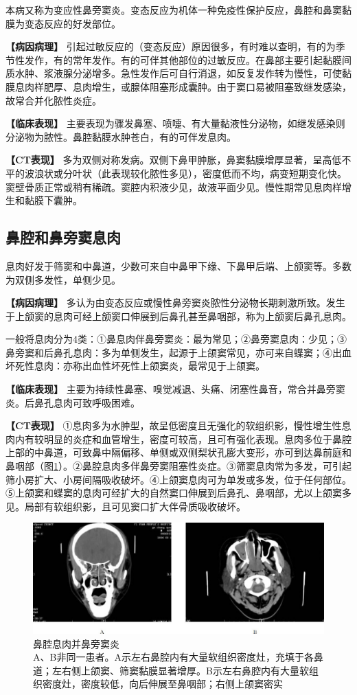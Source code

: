 本病又称为变应性鼻旁窦炎。变态反应为机体一种免疫性保护反应，鼻腔和鼻窦黏膜为变态反应的好发部位。

\textbf{【病因病理】}
引起过敏反应的（变态反应）原因很多，有时难以查明，有的为季节性发作，有的常年发作。有的可伴其他部位的过敏反应。在鼻部主要引起黏膜间质水肿、浆液腺分泌增多。急性发作后可自行消退，如反复发作转为慢性，可使黏膜息肉样肥厚、息肉增生，或腺体阻塞形成囊肿。由于窦口易被阻塞致继发感染，故常合并化脓性炎症。

\textbf{【临床表现】}
主要表现为骤发鼻塞、喷嚏、有大量黏液性分泌物，如继发感染则分泌物为脓性。鼻腔黏膜水肿苍白，有的可伴发息肉。

\textbf{【CT表现】}
多为双侧对称发病。双侧下鼻甲肿胀，鼻窦黏膜增厚显著，呈高低不平的波浪状或分叶状（此表现较化脓性多见），密度低而不均，病变短期变化快。窦壁骨质正常或稍有稀疏。窦腔内积液少见，故液平面少见。慢性期常见息肉样增生和黏膜下囊肿。

\subsection{鼻腔和鼻旁窦息肉}

息肉好发于筛窦和中鼻道，少数可来自中鼻甲下缘、下鼻甲后端、上颌窦等。多数为双侧多发性，单侧少见。

\textbf{【病因病理】}
多认为由变态反应或慢性鼻旁窦炎脓性分泌物长期刺激所致。发生于上颌窦的息肉可经上颌窦口伸展到后鼻孔甚至鼻咽部，称为上颌窦后鼻孔息肉。

一般将息肉分为4类：①鼻息肉伴鼻旁窦炎：最为常见；②鼻旁窦息肉：少见；③鼻旁窦和后鼻孔息肉：多为单侧发生，起源于上颌窦常见，亦可来自蝶窦；④出血坏死性息肉：亦称出血性坏死性上颌窦炎，最常见于上颌窦。

\textbf{【临床表现】}
主要为持续性鼻塞、嗅觉减退、头痛、闭塞性鼻音，常合并鼻旁窦炎。后鼻孔息肉可致呼吸困难。

\textbf{【CT表现】}
①息肉多为水肿型，故呈低密度且无强化的软组织影，慢性增生性息肉内有较明显的炎症和血管增生，密度可较高，且可有强化表现。息肉多位于鼻腔上部的中鼻道，可致鼻中隔偏移、单侧或双侧梨状孔膨大变形，亦可到达鼻前庭和鼻咽部（图\ref{fig5-5}）。②鼻腔息肉多伴鼻旁窦阻塞性炎症。③筛窦息肉常为多发，可引起筛小房扩大、小房间隔吸收破坏。④上颌窦息肉可为单发或多发，位于任何部位。⑤上颌窦和蝶窦的息肉可经扩大的自然窦口伸展到后鼻孔、鼻咽部，尤以上颌窦多见。局部有软组织影，且可见窦口扩大伴骨质吸收破坏。

\begin{figure}[!htbp]
 \centering
 \includegraphics[width=.7\textwidth,height=\textheight,keepaspectratio]{./images/Image00127.jpg}
 \captionsetup{justification=centering}
 \caption{鼻腔息肉并鼻旁窦炎\\{\small A、B非同一患者。A示左右鼻腔内有大量软组织密度灶，充填于各鼻道；左右侧上颌窦、筛窦黏膜显著增厚。B示左右鼻腔内有大量软组织密度灶，密度较低，向后伸展至鼻咽部；右侧上颌窦密实}}
 \label{fig5-5}
  \end{figure} 


